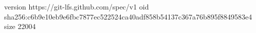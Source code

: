 version https://git-lfs.github.com/spec/v1
oid sha256:c6b9e10eb9e6fbc7877ec522524ca40adf858b54137c367a76b895f8849583e4
size 22004

